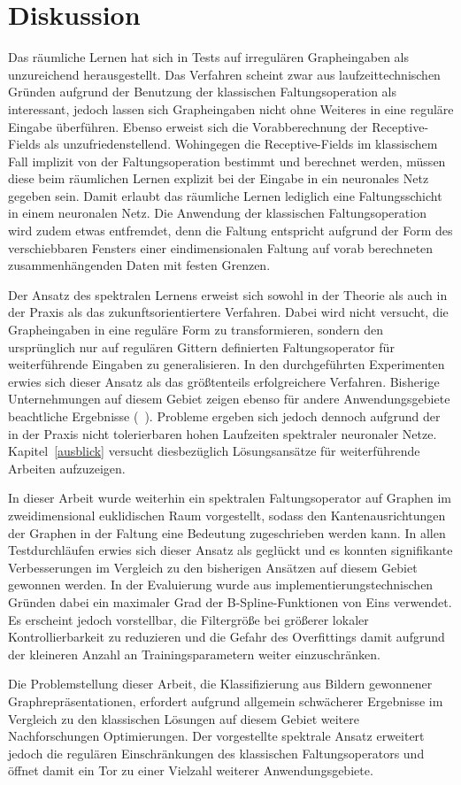 \section{Diskussion}
\label{diskussion}

Das räumliche Lernen hat sich in Tests auf irregulären Grapheingaben als unzureichend herausgestellt.
Das Verfahren scheint zwar aus laufzeittechnischen Gründen aufgrund der Benutzung der klassischen Faltungsoperation als interessant, jedoch lassen sich Grapheingaben nicht ohne Weiteres in eine reguläre Eingabe überführen.
Ebenso erweist sich die Vorabberechnung der Receptive-Fields als unzufriedenstellend.
Wohingegen die Receptive-Fields im klassischem Fall implizit von der Faltungsoperation bestimmt und berechnet werden, müssen diese beim räumlichen Lernen explizit bei der Eingabe in ein neuronales Netz gegeben sein.
Damit erlaubt das räumliche Lernen lediglich eine Faltungsschicht in einem neuronalen Netz.
Die Anwendung der klassischen Faltungsoperation wird zudem etwas entfremdet, denn die Faltung entspricht aufgrund der Form des verschiebbaren Fensters einer eindimensionalen Faltung auf vorab berechneten zusammenhängenden Daten mit festen Grenzen.

Der Ansatz des spektralen Lernens erweist sich sowohl in der Theorie als auch in der Praxis als das zukunftsorientiertere Verfahren.
Dabei wird nicht versucht, die Graph\-ein\-ga\-ben in eine reguläre Form zu transformieren, sondern den ursprünglich nur auf regulären Gittern definierten Faltungsoperator für weiterführende Eingaben zu generalisieren.
In den durchgeführten Experimenten erwies sich dieser Ansatz als das größtenteils erfolgreichere Verfahren.
Bisherige Unternehmungen auf diesem Gebiet zeigen ebenso für andere Anwendungsgebiete beachtliche Ergebnisse (\vgl{}~\cite{Defferrard, gcn}).
Probleme ergeben sich jedoch dennoch aufgrund der in der Praxis nicht tolerierbaren hohen Laufzeiten spektraler neuronaler Netze.
Kapitel~\ref{ausblick} versucht diesbezüglich Lösungsansätze für weiterführende Arbeiten aufzuzeigen.

In dieser Arbeit wurde weiterhin ein spektralen Faltungsoperator auf Graphen im zweidimensional euklidischen Raum vorgestellt, sodass den Kantenausrichtungen der Graphen in der Faltung eine Bedeutung zugeschrieben werden kann.
In allen Testdurchläufen erwies sich dieser Ansatz als geglückt und es konnten signifikante Verbesserungen im Vergleich zu den bisherigen Ansätzen auf diesem Gebiet gewonnen werden.
In der Evaluierung wurde aus implementierungstechnischen Gründen dabei ein maximaler Grad der B-Spline-Funktionen von Eins verwendet.
Es erscheint jedoch vorstellbar, die Filtergröße bei größerer lokaler Kontrollierbarkeit zu reduzieren und die Gefahr des Overfittings damit aufgrund der kleineren Anzahl an Trainingsparametern weiter einzuschränken.

Die Problemstellung dieser Arbeit, die Klassifizierung aus Bildern gewonnener Graph\-re\-prä\-sen\-ta\-tio\-nen, erfordert aufgrund allgemein schwächerer Ergebnisse im Vergleich zu den klassischen Lösungen auf diesem Gebiet weitere Nachforschungen \bzw{} Optimierungen.
Der vorgestellte spektrale Ansatz erweitert jedoch die regulären Einschränkungen des klassischen Faltungsoperators und öffnet damit ein Tor zu einer Vielzahl weiterer Anwendungsgebiete.
